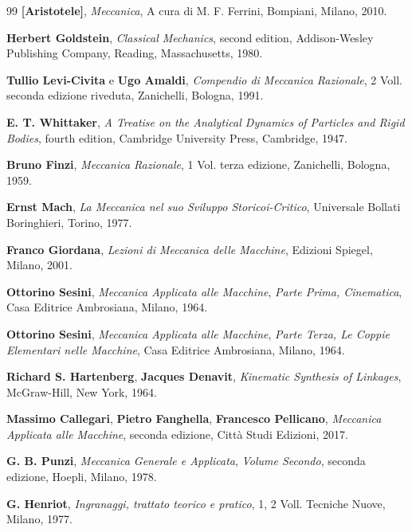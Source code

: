 \begin{thebibliography}{99}
\thispagestyle{empty}
 {\bfseries [Aristotele]},
		{\em Meccanica},
		 A cura di M. F. Ferrini,
		Bompiani, Milano, 2010.

 {\bfseries Herbert Goldstein}, 
		{\em Classical Mechanics}, 
	 second edition, Addison-Wesley Publishing Company, Reading,
	Massachusetts, 1980.

 {\bfseries Tullio Levi-Civita}
	 e {\bfseries Ugo Amaldi}, 
	{\em Compendio di Meccanica Razionale}, 2 Voll.
	seconda edizione riveduta, Zanichelli, Bologna, 1991.

 {\bfseries E. T. Whittaker}, 
	{\em A Treatise on the Analytical Dynamics of Particles and Rigid Bodies},
	fourth edition, Cambridge University Press, Cambridge, 1947.

 {\bfseries Bruno Finzi}, 
	{\em Meccanica Razionale},
	1 Vol.
	terza edizione, Zanichelli, Bologna, 1959. 

 {\bfseries Ernst Mach}, 
	{\em La Meccanica nel suo Sviluppo Storicoi-Critico},
	Universale Bollati Boringhieri, Torino, 1977. 

 {\bfseries Franco Giordana}, 
	{\em Lezioni di Meccanica delle Macchine},
	Edizioni Spiegel, Milano, 2001. 

 {\bfseries Ottorino Sesini},
	{\em Meccanica Applicata alle Macchine},
	{\em Parte Prima, Cinematica},
	Casa Editrice Ambrosiana, Milano, 1964.	

 {\bfseries Ottorino Sesini},
        {\em Meccanica Applicata alle Macchine},
        {\em Parte Terza, Le Coppie Elementari nelle Macchine},
        Casa Editrice Ambrosiana, Milano, 1964.

 {\bfseries Richard S. Hartenberg}, {\bfseries Jacques
 Denavit},
        {\em Kinematic Synthesis of Linkages},
        McGraw-Hill, New York, 1964.

 {\bfseries Massimo Callegari},
	{\bfseries Pietro Fanghella}, {\bfseries Francesco Pellicano},
	{\em Meccanica Applicata alle Macchine},
	seconda edizione, Citt\`a Studi Edizioni, 2017.

 {\bfseries G. B. Punzi},
	{\em Meccanica Generale e Applicata},
	{\em Volume Secondo},
	seconda edizione, Hoepli, Milano, 1978.

 {\bfseries G. Henriot},
	{\em Ingranaggi, trattato teorico e pratico}, 1, 2 Voll.
	Tecniche Nuove, Milano, 1977.


\end{thebibliography}
